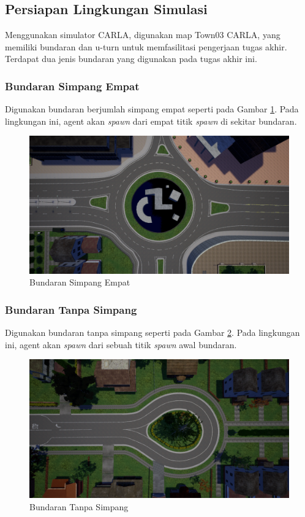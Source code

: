 \documentclass[conference]{IEEEtran}
\begin{document}
\subsection{Persiapan Lingkungan Simulasi}
\label{sec:simulasi}
Menggunakan simulator CARLA, digunakan map Town03 CARLA, yang memiliki bundaran dan u-turn untuk memfasilitasi pengerjaan tugas akhir. Terdapat dua jenis bundaran yang digunakan pada tugas akhir ini.

\subsubsection{Bundaran Simpang Empat}
Digunakan bundaran berjumlah simpang empat seperti pada Gambar  \ref{fig:bundaran_town03}. Pada lingkungan ini, agent akan \textit{spawn }dari empat titik \textit{spawn} di sekitar bundaran.
\begin{figure}[H] 
	\centering
	\includegraphics[width=.7\linewidth]{images/bundaran}
	\caption{Bundaran Simpang Empat}
	\label{fig:bundaran_town03}
\end{figure}

\subsubsection{Bundaran Tanpa Simpang}
Digunakan bundaran tanpa simpang seperti pada Gambar  \ref{fig:bundaran_tanpa_simpang}. Pada lingkungan ini, agent akan \textit{spawn }dari sebuah titik \textit{spawn} awal bundaran.
\begin{figure}[H] 
	\centering
	\includegraphics[width=.7\linewidth]{images/bundaran_tanpa_simpang}
	\caption{Bundaran Tanpa Simpang}
	\label{fig:bundaran_tanpa_simpang}
\end{figure}
\end{document}

